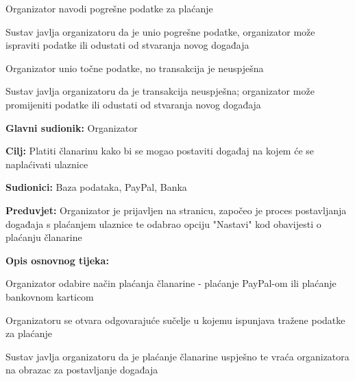\begin{packed_item}
\begin{packed_item}
\begin{packed_enum}
		\end{packed_enum}
		\item[5.a] Organizator navodi pogrešne podatke za plaćanje
		\item[] \begin{packed_enum}
			
			\item Sustav javlja organizatoru da je unio pogrešne podatke, organizator može ispraviti podatke ili odustati od stvaranja novog događaja
			
		\end{packed_enum}
		
		\item[5.b] Organizator unio točne podatke, no transakcija je neuspješna
			\item[] \begin{packed_enum}
			
			\item Sustav javlja organizatoru da je transakcija neuspješna; organizator može promijeniti podatke ili odustati od stvaranja novog događaja
			
		\end{packed_enum}
	\end{packed_item}
\end{packed_item}


					\noindent {}
\begin{packed_item}
	\item \textbf{Glavni sudionik:} Organizator
	\item  \textbf{Cilj:} Platiti članarinu kako bi se mogao postaviti događaj na kojem će se naplaćivati ulaznice
	\item  \textbf{Sudionici:} Baza podataka, PayPal, Banka
	\item  \textbf{Preduvjet:} Organizator je prijavljen na stranicu, započeo je proces postavljanja događaja s plaćanjem ulaznice te odabrao opciju "Nastavi" kod obavijesti o plaćanju članarine
	\item  \textbf{Opis osnovnog tijeka:}
	
	\item[] \begin{packed_enum}
		
		\item Organizator odabire način plaćanja članarine - plaćanje PayPal-om ili plaćanje bankovnom karticom
		\item Organizatoru se otvara odgovarajuće sučelje u kojemu ispunjava tražene podatke za plaćanje
		\item Sustav javlja organizatoru da je plaćanje članarine uspješno te vraća organizatora na obrazac za postavljanje događaja
	\end{packed_enum}
	
\end{packed_item}

